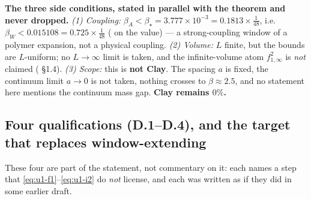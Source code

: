 \noindent\textbf{The three side conditions, stated in parallel with the theorem and never
dropped.} \emph{(1) Coupling:} $\beta_A<\beta_\star=3.777\times10^{-3}=0.1813\times\tfrac1{48}$, i.e.\ $\beta_W<0.015108=0.725\times\tfrac1{48}$ (\LC{} on the value) --- a
strong-coupling window of a polymer expansion, not a physical coupling.
\emph{(2) Volume:} $L$ finite, but the bounds are
$L$-uniform; no $L\to\infty$ limit is taken, and the infinite-volume atom $f_{1,\infty}^2$ is
\emph{not} claimed ( \S1.4). \emph{(3) Scope:} this is
\textbf{not Clay}. The spacing $a$ is fixed, the continuum limit $a\to0$ is not taken, nothing
crosses to $\beta\approx2.5$, and no statement here mentions the continuum mass gap.
\textbf{Clay remains $0\%$.}

\subsection{Four qualifications (D.1--D.4), and the target that replaces window-extending}
\label{sec:u1-d}

\noindent These four are part of the statement, not commentary on it: each names a step that
\eqref{eq:u1-f1}--\eqref{eq:u1-i2} do \emph{not} license, and each was written as if they did in
some earlier draft.

